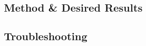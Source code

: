 \documentclass[12pt,a4paper,oneside]{article}
\begin{document}
\subsection{Method \& Desired Results}
\label{sec:Testing_Method}

\subsection{Troubleshooting}
\label{sec:Testing_Troubleshooting}

 \newpage
 

\appendix

% 
\end{document}
